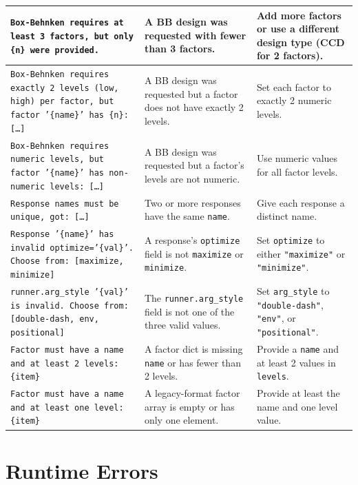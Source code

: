 \documentclass[11pt]{book}
\begin{document}
\begin{longtable}{@{}p{5.5cm}p{5.5cm}p{5.5cm}@{}}
\texttt{Box-Behnken requires at least 3 factors, but only \{n\} were provided.} &
A BB design was requested with fewer than 3 factors. &
Add more factors or use a different design type (CCD for 2 factors). \\
\midrule

\texttt{Box-Behnken requires exactly 2 levels (low, high) per factor, but factor '\{name\}' has \{n\}: [\ldots]} &
A BB design was requested but a factor does not have exactly 2 levels. &
Set each factor to exactly 2 numeric levels. \\
\midrule

\texttt{Box-Behnken requires numeric levels, but factor '\{name\}' has non-numeric levels: [\ldots]} &
A BB design was requested but a factor's levels are not numeric. &
Use numeric values for all factor levels. \\
\midrule

\texttt{Response names must be unique, got: [\ldots]} &
Two or more responses have the same \texttt{name}. &
Give each response a distinct name. \\
\midrule

\texttt{Response '\{name\}' has invalid optimize='\{val\}'. Choose from: [maximize, minimize]} &
A response's \texttt{optimize} field is not \texttt{maximize} or \texttt{minimize}. &
Set \texttt{optimize} to either \texttt{"maximize"} or \texttt{"minimize"}. \\
\midrule

\texttt{runner.arg\_style '\{val\}' is invalid. Choose from: [double-dash, env, positional]} &
The \texttt{runner.arg\_style} field is not one of the three valid values. &
Set \texttt{arg\_style} to \texttt{"double-dash"}, \texttt{"env"}, or \texttt{"positional"}. \\
\midrule

\texttt{Factor must have a name and at least 2 levels: \{item\}} &
A factor dict is missing \texttt{name} or has fewer than 2 levels. &
Provide a \texttt{name} and at least 2 values in \texttt{levels}. \\
\midrule

\texttt{Factor must have a name and at least one level: \{item\}} &
A legacy-format factor array is empty or has only one element. &
Provide at least the name and one level value. \\

\bottomrule
\end{longtable}

\section{Runtime Errors}
\end{document}
